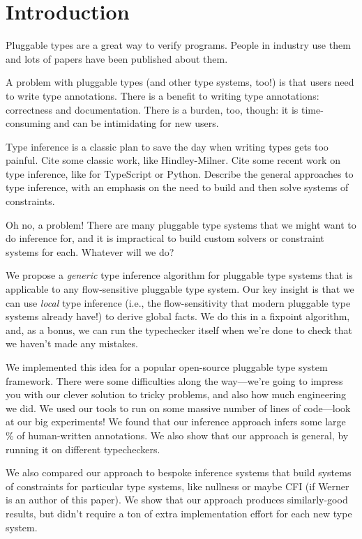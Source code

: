 \section{Introduction}
\label{sec:intro}


Pluggable types are a great way to verify programs. People in industry
use them and lots of papers have been published about them.

A problem with pluggable types (and other type systems, too!) is that
users need to write type annotations. There is a benefit to writing
type annotations: correctness and documentation. There is a burden, too, though: it
is time-consuming and can be intimidating for new users.

Type inference is a classic plan to save the day when writing types gets
too painful. Cite some classic work, like Hindley-Milner. Cite some recent
work on type inference, like for TypeScript or Python. Describe the general
approaches to type inference, with an emphasis on the need to build and then
solve systems of constraints.

Oh no, a problem! There are many pluggable type systems that we might want
to do inference for, and it is impractical to build custom solvers or
constraint systems for each. Whatever will we do?

We propose a \emph{generic} type inference algorithm for pluggable type
systems that is applicable to any flow-sensitive pluggable type system.
Our key insight is that we can use \emph{local} type inference (i.e.,
the flow-sensitivity that modern pluggable type systems already have!)
to derive global facts. We do this in a fixpoint algorithm, and, as a bonus,
we can run the typechecker itself when we're done to check that we haven't
made any mistakes.

We implemented this idea for a popular open-source pluggable type system
framework. There were some difficulties along the way---we're going to
impress you with our clever solution to tricky problems, and also how much
engineering we did. We used our tools to run
on some massive number of lines of code---look at our big experiments!
We found that our inference approach infers some large \% of human-written
annotations. We also show that our approach is general, by running it
on  different typecheckers.

We also compared our approach to bespoke inference systems that build
systems of constraints for particular type systems, like nullness or
maybe CFI (if Werner is an author of this paper). We show that our approach
produces similarly-good results, but didn't require a ton of extra
implementation effort for each new type system.

